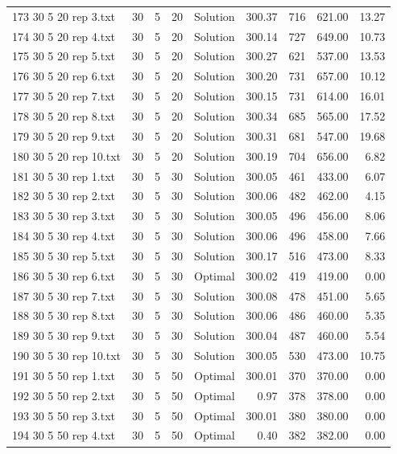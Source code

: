 \begin{longtable}{lrrllrrrr}
173 30 5 20 rep 3.txt & 30 & 5 & 20 & Solution & 300.37 & 716 & 621.00 & 13.27\\
174 30 5 20 rep 4.txt & 30 & 5 & 20 & Solution & 300.14 & 727 & 649.00 & 10.73\\
175 30 5 20 rep 5.txt & 30 & 5 & 20 & Solution & 300.27 & 621 & 537.00 & 13.53\\
176 30 5 20 rep 6.txt & 30 & 5 & 20 & Solution & 300.20 & 731 & 657.00 & 10.12\\
177 30 5 20 rep 7.txt & 30 & 5 & 20 & Solution & 300.15 & 731 & 614.00 & 16.01\\
178 30 5 20 rep 8.txt & 30 & 5 & 20 & Solution & 300.34 & 685 & 565.00 & 17.52\\
179 30 5 20 rep 9.txt & 30 & 5 & 20 & Solution & 300.31 & 681 & 547.00 & 19.68\\
180 30 5 20 rep 10.txt & 30 & 5 & 20 & Solution & 300.19 & 704 & 656.00 &  6.82\\
181 30 5 30 rep 1.txt & 30 & 5 & 30 & Solution & 300.05 & 461 & 433.00 &  6.07\\
182 30 5 30 rep 2.txt & 30 & 5 & 30 & Solution & 300.06 & 482 & 462.00 &  4.15\\
183 30 5 30 rep 3.txt & 30 & 5 & 30 & Solution & 300.05 & 496 & 456.00 &  8.06\\
184 30 5 30 rep 4.txt & 30 & 5 & 30 & Solution & 300.06 & 496 & 458.00 &  7.66\\
185 30 5 30 rep 5.txt & 30 & 5 & 30 & Solution & 300.17 & 516 & 473.00 &  8.33\\
186 30 5 30 rep 6.txt & 30 & 5 & 30 & Optimal & 300.02 & 419 & 419.00 &  0.00\\
187 30 5 30 rep 7.txt & 30 & 5 & 30 & Solution & 300.08 & 478 & 451.00 &  5.65\\
188 30 5 30 rep 8.txt & 30 & 5 & 30 & Solution & 300.06 & 486 & 460.00 &  5.35\\
189 30 5 30 rep 9.txt & 30 & 5 & 30 & Solution & 300.04 & 487 & 460.00 &  5.54\\
190 30 5 30 rep 10.txt & 30 & 5 & 30 & Solution & 300.05 & 530 & 473.00 & 10.75\\
191 30 5 50 rep 1.txt & 30 & 5 & 50 & Optimal & 300.01 & 370 & 370.00 &  0.00\\
192 30 5 50 rep 2.txt & 30 & 5 & 50 & Optimal &  0.97 & 378 & 378.00 &  0.00\\
193 30 5 50 rep 3.txt & 30 & 5 & 50 & Optimal & 300.01 & 380 & 380.00 &  0.00\\
194 30 5 50 rep 4.txt & 30 & 5 & 50 & Optimal &  0.40 & 382 & 382.00 &  0.00\\

\end{longtable}
